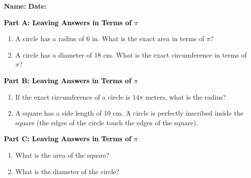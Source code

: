 \documentclass[12pt, letterpaper, fleqn]{article}
\newcommand{\blank}{\underline{\hspace{2.2cm}}}
\begin{document}
\textbf{Name:} \underline{\hspace{5cm}}
\hfill
\textbf{Date:} \underline{\hspace{3cm}}\\

\begin{tcolorbox}[colback=customteal!20]
\large\textcolor{black}{\textbf{Part A: Leaving Answers in Terms of $\pi$}}
\end{tcolorbox}

\vspace{3mm}

\begin{enumerate}[itemsep=5.5cm, leftmargin=0.6cm]
\item A circle has a radius of $6\text{ in}$. What is the exact area in terms of $\pi$?
\item A circle has a diameter of $18\text{ cm}$. What is the exact circumference in terms of $\pi$?
\end{enumerate}

\newpage

\begin{tcolorbox}[colback=customteal!20]
\large\textcolor{black}{\textbf{Part B: Leaving Answers in Terms of $\pi$}}
\end{tcolorbox}

\vspace{3mm}

\begin{enumerate}[itemsep=5.5cm, leftmargin=0.6cm, resume]
\item If the exact circumference of a circle is $14\pi\text{ meters}$, what is the radius?
\item A square has a side length of $10\text{ cm}$. A circle is perfectly inscribed inside the square (the edges of the circle touch the edges of the square). 
\end{enumerate}

\newpage

\begin{tcolorbox}[colback=customteal!20]
\large\textcolor{black}{\textbf{Part C: Leaving Answers in Terms of $\pi$}}
\end{tcolorbox}

\vspace{3mm}

\begin{enumerate}[itemsep=5.5cm, leftmargin=0.6cm, resume]
\item What is the area of the square? \blank
\item What is the diameter of the circle? \blank
\end{enumerate}
\end{document}
